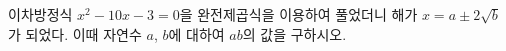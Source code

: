이차방정식 $x^2-10x-3=0$을 완전제곱식을 이용하여 풀었더니 해가 $x=a\pm 2\sqrt{b}$가 되었다. 이때 자연수 $a$, $b$에 대하여 $ab$의 값을 구하시오.
